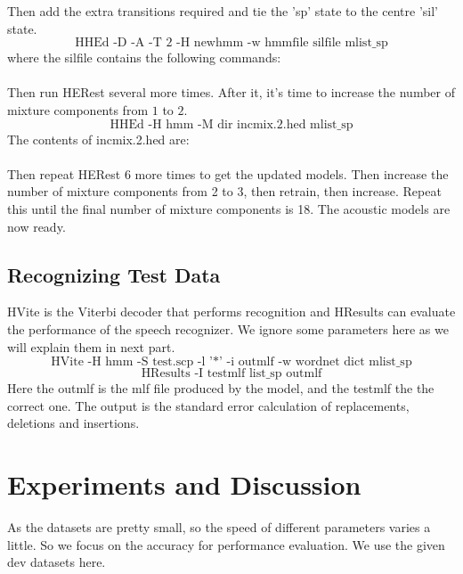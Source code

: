 \documentclass{article}
\begin{document}
Then add the extra transitions required and tie the 'sp' state to the centre 'sil' state.
$$\text{HHEd -D -A -T 2 -H newhmm -w hmmfile silfile mlist\_sp}$$
where the silfile contains the following commands:\\[2mm]
\\[2mm]
Then run HERest several more times. 	After it, it's time to increase the number of mixture components from $1$ to $2$. 
$$\text{HHEd -H hmm -M dir incmix.2.hed mlist\_sp}$$
The contents of incmix.2.hed are:\\[2mm]
\\[2mm]
Then repeat HERest 6 more times to get the updated models. Then increase the number of mixture components from 2 to 3, then retrain, then increase. Repeat this until the final number of mixture components is 18. The acoustic models are now ready.
\subsection{Recognizing Test Data}  
HVite is the Viterbi decoder that performs recognition and HResults can evaluate the performance of the speech recognizer. We ignore some parameters here as we will explain them in next part. 
$$\text{HVite -H hmm -S test.scp -l '*' -i outmlf -w wordnet dict mlist\_sp}$$
$$\text{HResults -I testmlf list\_sp outmlf}$$
Here the outmlf is the mlf file produced by the model, and the testmlf the the correct one. The output is the standard error calculation of replacements, deletions and insertions. 
\section{Experiments and Discussion}
As the datasets are pretty small, so the speed of different parameters varies a little. So we focus on the accuracy for performance evaluation. We use the given dev datasets here. 
\end{document}
